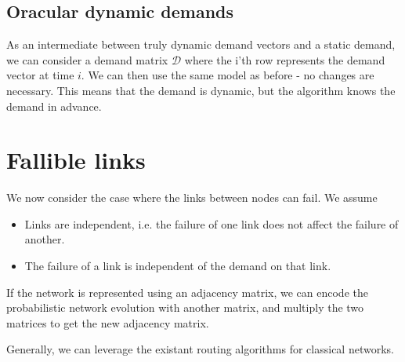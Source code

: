 \documentclass{amsart}
\begin{document}
    \subsection{Oracular dynamic demands}

    As an intermediate between truly dynamic demand vectors and a static demand, we can consider a demand matrix \(\mathcal{D}\) where the i'th row represents the demand vector at time \(i\). We can then use the same model as before - no changes are necessary. This means that the demand is dynamic, but the algorithm knows the demand in advance.

    \section{Fallible links}

    We now consider the case where the links between nodes can fail. We assume \begin{itemize}
        \item Links are independent, i.e. the failure of one link does not affect the failure of another. 
        \item The failure of a link is independent of the demand on that link.
    \end{itemize}

    If the network is represented using an adjacency matrix, we can encode the probabilistic network evolution with another matrix, and multiply the two matrices to get the new adjacency matrix. 

    Generally, we can leverage the existant routing algorithms for classical networks.
\end{document}
